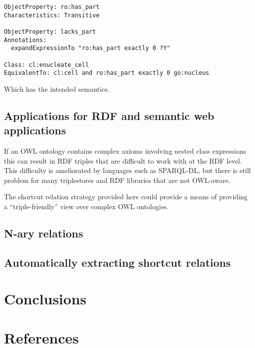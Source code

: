 \documentclass[11pt]{article}
\begin{document}
\begin{verbatim}
ObjectProperty: ro:has_part
Characteristics: Transitive

ObjectProperty: lacks_part
Annotations:
  expandExpressionTo "ro:has_part exactly 0 ?Y"

Class: cl:enucleate_cell
EquivalentTo: cl:cell and ro:has_part exactly 0 go:nucleus
\end{verbatim}

Which has the intended semantics.

\subsection{Applications for RDF and semantic web applications}

If an OWL ontology contains complex axioms involving nested class
expressions this can result in RDF triples that are difficult to work
with at the RDF level. This difficulty is ameliorated by languages
such as SPARQL-DL, but there is still problem for many triplestores
and RDF libraries that are not OWL-aware.

The shortcut relation strategy provided here could provide a means of
providing a ``triple-friendly'' view over complex OWL ontologies.

\subsection{N-ary relations}


\subsection{Automatically extracting shortcut relations}


\section{Conclusions}

\section{References}



\end{document}
